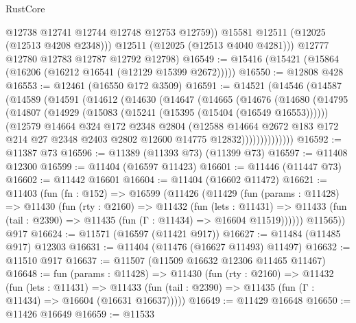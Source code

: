 \begin{lexlean}{RustCore}
\begin{coremodule}
              @12738
              @12741
              @12744
              @12748
              @12753
              @12759))
          @15581
          @12511
          (@12025 (@12513 @4208 @2348)))
        @12511
        (@12025 (@12513 @4040 @4281)))
      @12777
      @12780
      @12783
      @12787
      @12792
      @12798)
@16549 := @15416 (@15421 (@15864 (@16206 (@16212 @16541 (@12129 @15399 @2672)))))
@16550 := @12808 @428
@16553 := @12461 (@16550 @172 @3509)
@16591 := @14521
    (@14546
      (@14587
        (@14589
          (@14591
            (@14612
              (@14630
                (@14647
                  (@14665
                    (@14676
                      (@14680
                        (@14795
                          (@14807
                            (@14929 (@15083 (@15241 (@15395 (@15404 (@16549 @16553))))))
                            (@12579
                              @14664
                              @324
                              @172
                              @2348
                              @2804
                              (@12588
                                @14664
                                @2672
                                @183
                                @172
                                @214
                                @27
                                @2348
                                @2403
                                @2802
                                @12600
                                @14775
                                @12832))))))))))))))
@16592 := @11387 @73
@16596 := @11389 (@11393 @73) (@11399 @73)
@16597 := @11408 @12300
@16599 := @11404 (@16597 @11423)
@16601 := @11446 (@11447 @73)
@16602 := @11442 @16601
@16604 := @11404 (@16602 @11472)
@16621 := @11403
    (fun (fn : @152) =>
    @16599
      (@11426
        (@11429
          (fun (params : @11428) =>
          @11430
            (fun (rty : @2160) =>
            @11432
              (fun (lets : @11431) =>
              @11433 (fun (tail : @2390) => @11435 (fun (Γ : @11434) => @16604 @11519))))))
        @11565))
    @917
@16624 := @11571 (@16597 (@11421 @917))
@16627 := @11484 (@11485 @917) @12303
@16631 := @11404 (@11476 (@16627 @11493) @11497)
@16632 := @11510 @917
@16637 := @11507 (@11509 @16632 @12306 @11465 @11467)
@16648 := fun (params : @11428) =>
  @11430
    (fun (rty : @2160) =>
    @11432
      (fun (lets : @11431) =>
      @11433 (fun (tail : @2390) => @11435 (fun (Γ : @11434) => @16604 (@16631 @16637)))))
@16649 := @11429 @16648
@16650 := @11426 @16649
@16659 := @11533

\end{coremodule}
\end{lexlean}
